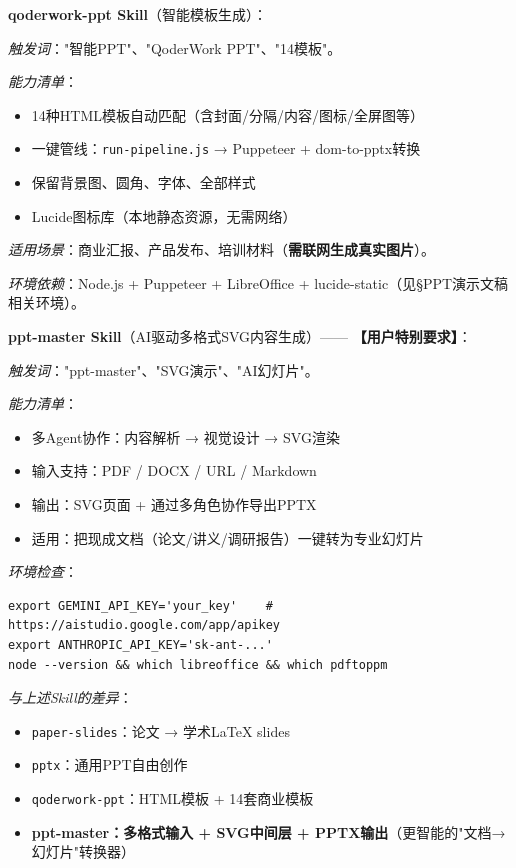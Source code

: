 \textbf{qoderwork-ppt Skill}（智能模板生成）：

\textit{触发词}："智能PPT"、"QoderWork PPT"、"14模板"。

\textit{能力清单}：
\begin{itemize}[leftmargin=1em]
  \item 14种HTML模板自动匹配（含封面/分隔/内容/图标/全屏图等）
  \item 一键管线：\texttt{run-pipeline.js} → Puppeteer + dom-to-pptx转换
  \item 保留背景图、圆角、字体、全部样式
  \item Lucide图标库（本地静态资源，无需网络）
\end{itemize}

\textit{适用场景}：商业汇报、产品发布、培训材料（\textbf{需联网生成真实图片}）。

\textit{环境依赖}：Node.js + Puppeteer + LibreOffice + lucide-static（见§PPT演示文稿相关环境）。

\textbf{ppt-master Skill}（AI驱动多格式SVG内容生成）—— \textbf{【用户特别要求】}：

\textit{触发词}："ppt-master"、"SVG演示"、"AI幻灯片"。

\textit{能力清单}：
\begin{itemize}[leftmargin=1em]
  \item 多Agent协作：内容解析 → 视觉设计 → SVG渲染
  \item 输入支持：PDF / DOCX / URL / Markdown
  \item 输出：SVG页面 + 通过多角色协作导出PPTX
  \item 适用：把现成文档（论文/讲义/调研报告）一键转为专业幻灯片
\end{itemize}

\textit{环境检查}：
\begin{lstlisting}[style=shell]
export GEMINI_API_KEY='your_key'    # https://aistudio.google.com/app/apikey
export ANTHROPIC_API_KEY='sk-ant-...'
node --version && which libreoffice && which pdftoppm
\end{lstlisting}

\textit{与上述Skill的差异}：
\begin{itemize}[leftmargin=1em]
  \item \texttt{paper-slides}：论文 → 学术LaTeX slides
  \item \texttt{pptx}：通用PPT自由创作
  \item \texttt{qoderwork-ppt}：HTML模板 + 14套商业模板
  \item \textbf{ppt-master：多格式输入 + SVG中间层 + PPTX输出}（更智能的"文档→幻灯片"转换器）
\end{itemize}

